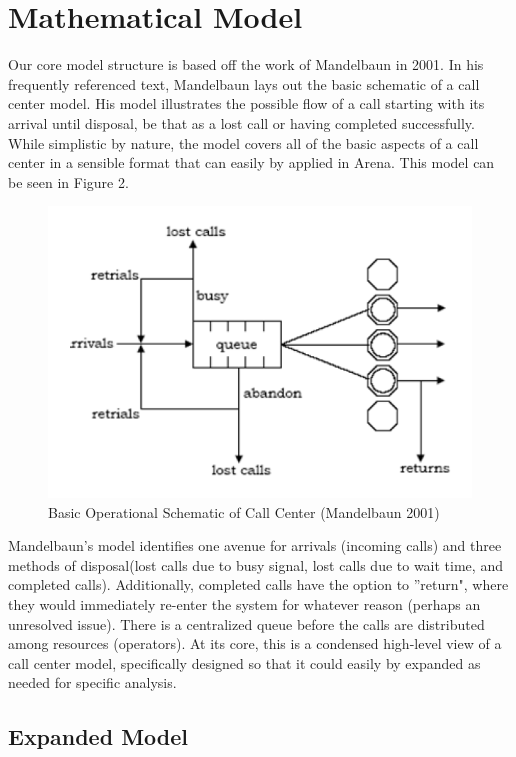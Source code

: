 \documentclass[12pt,twocolumn]{article}
\begin{document}
\section{Mathematical Model}

Our core model structure is based off the work of Mandelbaun in 2001.  In his frequently referenced text, Mandelbaun lays out the basic schematic of a call center model.  His model illustrates the possible flow of a call starting with its arrival until disposal, be that as a lost call or having completed successfully.\cite{mandelbaun}  While simplistic by nature, the model covers all of the basic aspects of a call center in a sensible format that can easily by applied in Arena.  This model can be seen in Figure 2.  

	\begin{figure}[h]
	\includegraphics[scale=.45]{call_center_layout.png}
	\caption{Basic Operational Schematic of Call Center (Mandelbaun 2001)}
	\end{figure}

Mandelbaun's model identifies one avenue for arrivals (incoming calls) and three methods of disposal(lost calls due to busy signal, lost calls due to wait time, and completed calls).  Additionally, completed calls have the option to ''return", where they would immediately re-enter the system for whatever reason (perhaps an unresolved issue).  There is a centralized queue before the calls are distributed among resources (operators).  At its core, this is a condensed high-level view of a call center model, specifically designed so that it could easily by expanded as needed for specific analysis.

\subsection{Expanded Model}
\end{document}
